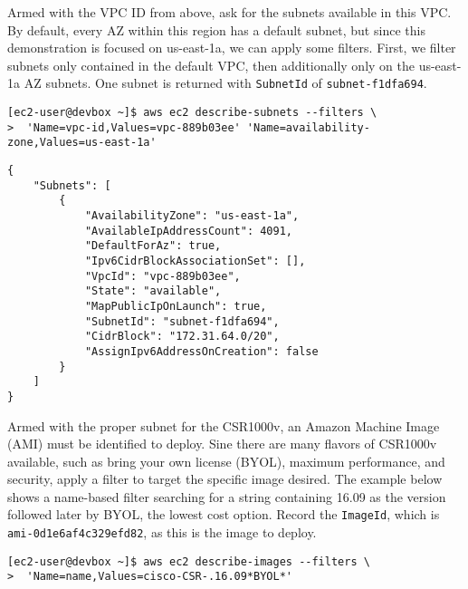 Armed with the VPC ID from above, ask for the subnets available in this VPC.
By default, every AZ within this region has a default subnet, but since this
demonstration is focused on us-east-1a, we can apply some filters. First, we
filter subnets only contained in the default VPC, then additionally only on
the us-east-1a AZ subnets. One subnet is returned with \verb|SubnetId|
of \verb|subnet-f1dfa694|.

\begin{verbatim}
[ec2-user@devbox ~]$ aws ec2 describe-subnets --filters \
>  'Name=vpc-id,Values=vpc-889b03ee' 'Name=availability-zone,Values=us-east-1a'
\end{verbatim}

\begin{verbatim}
{
    "Subnets": [
        {
            "AvailabilityZone": "us-east-1a", 
            "AvailableIpAddressCount": 4091, 
            "DefaultForAz": true, 
            "Ipv6CidrBlockAssociationSet": [], 
            "VpcId": "vpc-889b03ee", 
            "State": "available", 
            "MapPublicIpOnLaunch": true, 
            "SubnetId": "subnet-f1dfa694", 
            "CidrBlock": "172.31.64.0/20", 
            "AssignIpv6AddressOnCreation": false
        }
    ]
}
\end{verbatim}

Armed with the proper subnet for the CSR1000v, an Amazon Machine Image (AMI)
must be identified to deploy. Sine there are many flavors of CSR1000v
available, such as bring your own license (BYOL), maximum performance, and
security, apply a filter to target the specific image desired. The example
below shows a name-based filter searching for a string containing 16.09 as the
version followed later by BYOL, the lowest cost option. Record the \verb|ImageId|,
which is \verb|ami-0d1e6af4c329efd82|, as this is the image to deploy.

\begin{verbatim}
[ec2-user@devbox ~]$ aws ec2 describe-images --filters \
>  'Name=name,Values=cisco-CSR-.16.09*BYOL*'
\end{verbatim}

